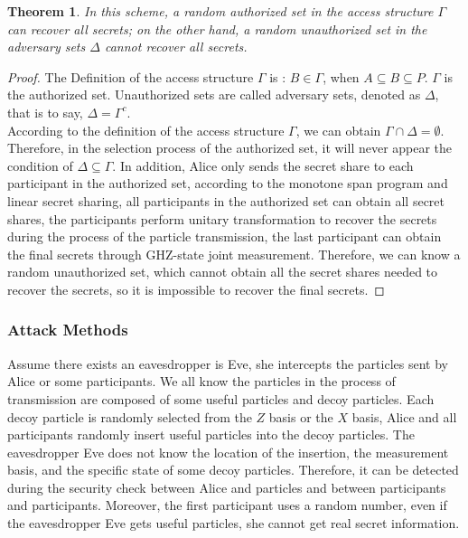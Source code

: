 \documentclass[pdflatex,sn-mathphys]{sn-jnl}%
\theoremstyle{thmstyleone}%
\newtheorem{theorem}{Theorem}%
\theoremstyle{thmstyletwo}%
\theoremstyle{thmstylethree}%
\begin{document}
\begin{theorem}
 In this scheme, a random authorized set in the access structure $\varGamma$ can recover all secrets; on the other hand, a random unauthorized set in the adversary sets $\Delta$ cannot recover all secrets. 
\end{theorem}
\begin{proof}
    The Definition of the access structure $\varGamma$ is : $ B\in\varGamma$, when $A\subseteq B\subseteq P $.  $\varGamma $ is the authorized set. Unauthorized sets are called adversary sets, denoted as $\Delta $, that is to say, $\Delta=\varGamma^c $.\\
\indent According to the definition of the access structure $\varGamma$, we can obtain $\varGamma \cap \Delta=\emptyset$. Therefore, in the selection process of the authorized set, it will never appear the condition of $\Delta \subseteq \varGamma$. In addition, Alice only sends the secret share to each participant in the authorized set, according to the monotone span program and linear secret sharing, all participants in the authorized set can obtain all secret shares, the participants perform unitary transformation to recover the secrets during the process of the particle transmission, the last participant can obtain the final secrets through GHZ-state joint measurement. Therefore, we can know a random unauthorized set, which cannot obtain all the secret shares needed to recover the secrets, so it is impossible to recover the final secrets.
\end{proof} 

\subsubsection{Attack Methods}\label{subsubsec2}

  Assume there exists an eavesdropper is Eve, she intercepts the particles sent by Alice or some participants. We all know the particles in the process of transmission are composed of some useful particles and decoy particles. Each decoy particle is randomly selected from the $Z$ basis or the $X$ basis, Alice and all participants randomly insert useful particles into the decoy particles. The eavesdropper Eve does not know the location of the insertion, the measurement basis, and the specific state of some decoy particles. Therefore, it can be detected during the security check between Alice and particles and between participants and participants. Moreover, the first participant uses a random number, even if the eavesdropper Eve gets useful particles, she cannot get real secret information.
\end{document}
